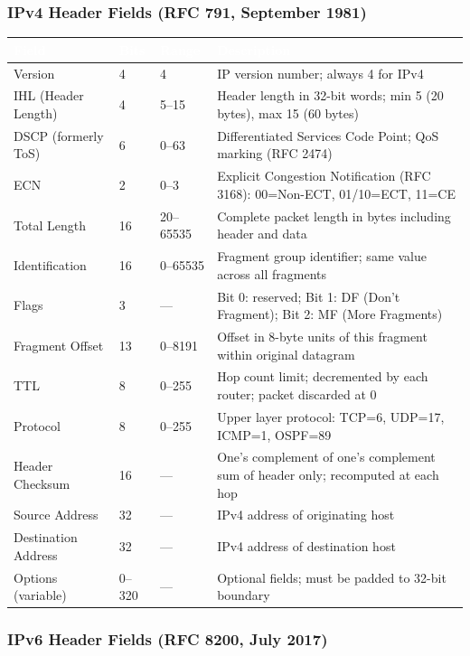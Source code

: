 \documentclass[11pt,letterpaper]{article}
\newcommand{\tableheader}[1]{\textbf{\sffamily\textcolor{white}{#1}}}
\begin{document}
\subsubsection{IPv4 Header Fields (RFC 791, September 1981)}

\begin{center}
\begin{tabularx}{\textwidth}{L{3.2cm}C{1.4cm}C{1.4cm}X}
\toprule
{}
\tableheader{Field} & \tableheader{Bits} & \tableheader{Range} & \tableheader{Description} \\
\midrule
Version & 4 & 4 & IP version number; always 4 for IPv4 \\
IHL (Header Length) & 4 & 5--15 & Header length in 32-bit words; min 5 (20 bytes), max 15 (60 bytes) \\
DSCP (formerly ToS) & 6 & 0--63 & Differentiated Services Code Point; QoS marking (RFC 2474) \\
ECN & 2 & 0--3 & Explicit Congestion Notification (RFC 3168): 00=Non-ECT, 01/10=ECT, 11=CE \\
Total Length & 16 & 20--65535 & Complete packet length in bytes including header and data \\
Identification & 16 & 0--65535 & Fragment group identifier; same value across all fragments \\
Flags & 3 & — & Bit 0: reserved; Bit 1: DF (Don't Fragment); Bit 2: MF (More Fragments) \\
Fragment Offset & 13 & 0--8191 & Offset in 8-byte units of this fragment within original datagram \\
TTL & 8 & 0--255 & Hop count limit; decremented by each router; packet discarded at 0 \\
Protocol & 8 & 0--255 & Upper layer protocol: TCP=6, UDP=17, ICMP=1, OSPF=89 \\
Header Checksum & 16 & — & One's complement of one's complement sum of header only; recomputed at each hop \\
Source Address & 32 & — & IPv4 address of originating host \\
Destination Address & 32 & — & IPv4 address of destination host \\
Options (variable) & 0--320 & — & Optional fields; must be padded to 32-bit boundary \\
\bottomrule
\end{tabularx}
\end{center}

\subsubsection{IPv6 Header Fields (RFC 8200, July 2017)}
\end{document}
